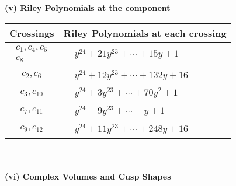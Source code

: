 \documentclass[1p]{elsarticle_modified}
\theoremstyle{definition}
\begin{document}
\newpage\renewcommand{\arraystretch}{1}
\flushleft \textbf{(v) Riley Polynomials at the component}\newline \\
\begin{tabular}{m{50pt}|m{274pt}}
Crossings & \hspace{64pt}Riley Polynomials at each crossing \\
\hline $$\begin{aligned}c_{1},c_{4},c_{5}\\c_{8}\end{aligned}$$&$\begin{aligned}
&y^{24}+21 y^{23}+\cdots+15 y+1
\end{aligned}$\\
\hline $$\begin{aligned}c_{2},c_{6}\end{aligned}$$&$\begin{aligned}
&y^{24}+12 y^{23}+\cdots+132 y+16
\end{aligned}$\\
\hline $$\begin{aligned}c_{3},c_{10}\end{aligned}$$&$\begin{aligned}
&y^{24}+3 y^{23}+\cdots+70 y^2+1
\end{aligned}$\\
\hline $$\begin{aligned}c_{7},c_{11}\end{aligned}$$&$\begin{aligned}
&y^{24}-9 y^{23}+\cdots- y+1
\end{aligned}$\\
\hline $$\begin{aligned}c_{9},c_{12}\end{aligned}$$&$\begin{aligned}
&y^{24}+11 y^{23}+\cdots+248 y+16
\end{aligned}$\\
\hline
\end{tabular}\\~\\
\newpage\flushleft \textbf{(vi) Complex Volumes and Cusp Shapes}
\end{document}
